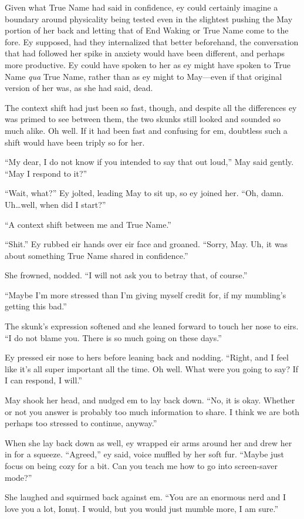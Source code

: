 Given what True Name had said in confidence, ey could certainly imagine a boundary around physicality being tested even in the slightest pushing the May portion of her back and letting that of End Waking or True Name come to the fore. Ey supposed, had they internalized that better beforehand, the conversation that had followed her spike in anxiety would have been different, and perhaps more productive. Ey could have spoken to her as ey might have spoken to True Name \emph{qua} True Name, rather than as ey might to May—even if that original version of her was, as she had said, dead.

The context shift had just been so fast, though, and despite all the differences ey was primed to see between them, the two skunks still looked and sounded so much alike. Oh well. If it had been fast and confusing for em, doubtless such a shift would have been triply so for her.

``My dear, I do not know if you intended to say that out loud,'' May said gently. ``May I respond to it?''

``Wait, what?'' Ey jolted, leading May to sit up, so ey joined her. ``Oh, damn. Uh\ldots well, when did I start?''

``A context shift between me and True Name.''

``Shit.'' Ey rubbed eir hands over eir face and groaned. ``Sorry, May. Uh, it was about something True Name shared in confidence.''

She frowned, nodded. ``I will not ask you to betray that, of course.''

``Maybe I'm more stressed than I'm giving myself credit for, if my mumbling's getting this bad.''

The skunk's expression softened and she leaned forward to touch her nose to eirs. ``I do not blame you. There is so much going on these days.''

Ey pressed eir nose to hers before leaning back and nodding. ``Right, and I feel like it's all super important all the time. Oh well. What were you going to say? If I can respond, I will.''

May shook her head, and nudged em to lay back down. ``No, it is okay. Whether or not you answer is probably too much information to share. I think we are both perhaps too stressed to continue, anyway.''

When she lay back down as well, ey wrapped eir arms around her and drew her in for a squeeze. ``Agreed,'' ey said, voice muffled by her soft fur. ``Maybe just focus on being cozy for a bit. Can you teach me how to go into screen-saver mode?''

She laughed and squirmed back against em. ``You are an enormous nerd and I love you a lot, Ionuț. I would, but you would just mumble more, I am sure.''
